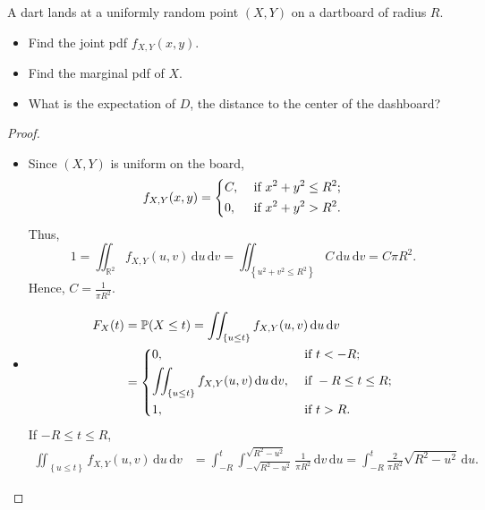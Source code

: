 \begin{eg}
    A dart lands at a uniformly random point \((X, Y)\) on a dartboard of radius \(R\). 
    \begin{itemize}
        \item [(a)] Find the joint pdf \(f_{X, Y}(x, y)\). 
        \item [(b)] Find the marginal pdf of \(X\).
        \item [(c)] What is the expectation of \(D\), the distance to the center of the dashboard?   
    \end{itemize}  
\end{eg}

\begin{proof}
    \hfill 
    \begin{itemize}
        \item [(a)] Since \((X, Y)\) is uniform on the board, 
        \[
            f_{X, Y}(x, y) = \begin{dcases}
                C, &\text{ if } x^2 + y^2 \le R^2 ;\\
                0, &\text{ if } x^2 + y^2 > R^2.
            \end{dcases}
        \]
        Thus, 
        \[
            1 = \iint_{\mathbb{R} ^2} f_{X, Y}(u, v) \, \mathrm{d} u \, \mathrm{d} v = \iint_{\left\{ u^2 + v^2 \le R^2 \right\} } C \, \mathrm{d} u \, \mathrm{d} v = C \pi R^2.    
        \]
        Hence, \(C = \frac{1}{\pi R^2}\).
        \item [(b)] 
        \begin{align*}
            F_X(t) &= \mathbb{P} (X \le t) = \iint_{\left\{ u \le t \right\} } f_{X, Y}(u, v) \, \mathrm{d} u \, \mathrm{d} v \\
            &= \begin{dcases}
                0, &\text{ if } t < -R ;\\
                \iint_{\left\{ u \le t \right\} } f_{X, Y}(u, v) \, \mathrm{d} u \, \mathrm{d} v, &\text{ if } -R \le t \le R ;\\
                1, &\text{ if } t > R .
            \end{dcases}  
        \end{align*}
        If \(-R \le t \le R\), 
        \begin{align*}
            \iint_{\left\{ u \le t \right\} } f_{X, Y}(u, v) \, \mathrm{d} u \, \mathrm{d} v &= \int _{-R}^t \int _{- \sqrt{R^2 - u^2}}^{\sqrt{R^2 - u^2}} \frac{1}{\pi R^2} \, \mathrm{d} v \, \mathrm{d} u = \int _{-R}^t \frac{2}{\pi R^2} \sqrt{R^2 - u^2} \, \mathrm{d} u.    

\end{align*}
\end{itemize}
\end{proof}
